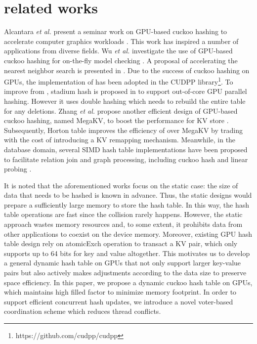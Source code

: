 \section{related works}\label{sec:rel}
Alcantara \textit{et al.} present a seminar work on GPU-based cuckoo hashing to accelerate computer graphics workloads \cite{alcantara2009real}. 
This work has inspired a number of applications from diverse fields. Wu \textit{et al.} investigate the use of GPU-based cuckoo hashing for
on-the-fly model checking \cite{wu2015gpu}. A proposal of accelerating the nearest neighbor search is presented in \cite{pan2010efficient}. 
Due to the success of cuckoo hashing on GPUs, the implementation of \cite{alcantara2009real} has been adopted in the CUDPP library\footnote{https://github.com/cudpp/cudpp}.
To improve from \cite{alcantara2009real}, stadium hash is proposed in \cite{khorasani2015stadium} to support out-of-core GPU parallel hashing. However it uses double hashing which needs to rebuild the entire table for any deletions.  
Zhang \textit{et al.} propose another efficient design of GPU-based cuckoo hashing, named MegaKV, 
to boost the performance for KV store \cite{zhang2015mega}. 
Subsequently, Horton table \cite{breslow2016horton} improves the efficiency of  over MegaKV by trading with the cost of introducing a KV remapping mechanism.
Meanwhile, in the database domain, several SIMD hash table implementations have been proposed to facilitate relation join and graph processing, including cuckoo hash \cite{ross2007efficient} and linear probing \cite{zhong2014medusa}. 

It is noted that the aforementioned works focus on the static case: the size of data that needs to be hashed is known in advance. Thus, the static designs would prepare a sufficiently large memory to store the hash table. In this way, the hash table operations are fast since the collision rarely happens. However, the static approach wastes memory resources and, to some extent, it prohibits data from other applications to coexist on the device memory. 
Moreover, existing GPU hash table design rely on atomicExch
operation to transact a KV pair, which only supports up to 64 bits for key and value altogether.
This motivates us to develop a general dynamic hash table on GPUs that not only support larger key-value pairs but also actively makes adjustments according to the data size to preserve space efficiency. 
In this paper, we propose a dynamic cuckoo hash table on GPUs, which maintains high filled factor to minimize memory footprint. In order to support efficient concurrent hash updates, we introduce a novel voter-based coordination scheme which reduces thread conflicts. 

